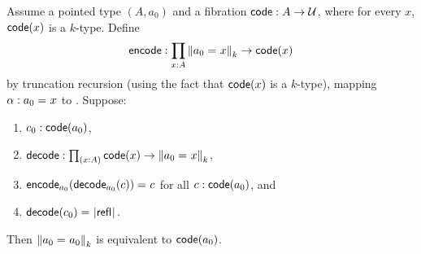 \documentclass[hott-all.tex]{subfiles}
\begin{document}
% 
% 
% 
% 
\begin{lem}
Assume a pointed type $(A,a_0)$ and a fibration
$\code : A \to \type$, where for every $x$, $\code(x)$ is a $k$-type.
Define
\[
\encode : \prd{x:A} \trunc{k}{\id{a_0}{x}} \to \code(x)
\]
by truncation recursion (using the fact
that $\code(x)$ is a $k$-type), mapping $\alpha : \id{a_0}{x}$ to
. Suppose:
\begin{enumerate}
\item $c_0 : \code(a_0)$,
\item $\decode : \prd{x:A} \code(x) \to \trunc{k}{\id{a_0}{x}}$,
\item {}
  $\id{\encode_{a_0}(\decode_{a_0}(c))}{c}$ for all $c : \code(a_0)$, and
\item {}
  $\id{\decode(c_0)}{\tproj{}{\refl{}}}$.
\end{enumerate}
Then $\trunc{k}{\id{a_0}{a_0}}$ is equivalent to $\code(a_0)$.
\end{lem}
% 
%
% 
\end{document}
